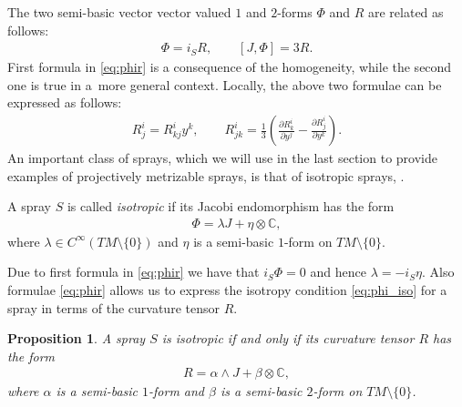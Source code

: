 \documentclass[11pt]{article}
\numberwithin{equation}{section}
\newtheorem{Proposition}[Theorem]{Proposition}
{\theoremstyle{definition}
\newtheorem{Remark}[Theorem]{Remark}
\newtheorem{Definition}[Theorem]{Definition}
}
\begin{document}
The two semi-basic vector vector valued $1$ and $2$-forms $\Phi$ and
$R$ are related as follows:
\begin{gather}
\Phi=i_SR, \qquad [J,\Phi]=3R. \label{eq:phir} \end{gather}
First formula in \eqref{eq:phir} is a consequence of the homogeneity,
while the second one is true in a~more general context. Locally, the
above two formulae can be expressed as follows:
\begin{gather*}
R^i_j=R^i_{kj}y^k, \qquad R^i_{jk}=\frac{1}{3}\left(\frac{\partial
    R^i_k}{\partial y^j}-\frac{\partial R^i_j}{\partial
    y^k}\right).%
    \end{gather*}
An important class of sprays, which we will use in the last section to
provide examples of projectively metrizable sprays, is that of
isotropic sprays, \cite[Def\/inition~3.29]{grifone00}.
\begin{Definition} A spray $S$ is called \emph{isotropic} if its Jacobi
  endomorphism has the form
\begin{gather}
\Phi=\lambda J + \eta \otimes \mathbb{C}, \label{eq:phi_iso}
\end{gather}
where $\lambda\in C^{\infty}(TM\setminus\{0\})$ and $\eta$ is a
semi-basic $1$-form on $TM\setminus\{0\}$.
\end{Definition}
Due to f\/irst formula in \eqref{eq:phir} we have that $i_S\Phi=0$ and
hence $\lambda=-i_S\eta$. Also formulae \eqref{eq:phir} allows us to express
the isotropy condition \eqref{eq:phi_iso} for a spray in terms of the curvature tensor
$R$.
\begin{Proposition} \label{prop:iso}
A spray $S$ is isotropic if and only if its curvature tensor $R$ has the form
\begin{gather}
R=\alpha\wedge J + \beta \otimes \mathbb{C}, \label{eq:r_iso}
\end{gather}
where $\alpha$ is a semi-basic $1$-form and $\beta$ is a semi-basic
$2$-form on $TM\setminus\{0\}$. \end{Proposition}
\end{document}
